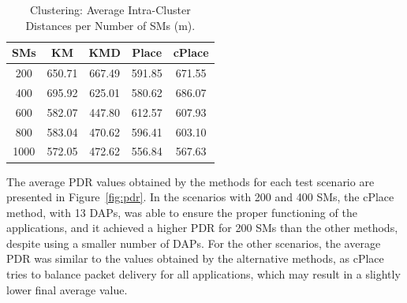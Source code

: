 \documentclass[a4paper,fleqn]{cas-dc}
\begin{document}
\begin{table}[ht]
    \centering
    \caption{Clustering: Average Intra-Cluster Distances per Number of \gls{SMs} (m).}
    \begin{tabular}{ccccc}
        \hline \hline
        \gls{SMs} & KM     & KMD    & Place  & cPlace \\ \hline
        200      & 650.71 & 667.49 & 591.85 & 671.55 \\
        400      & 695.92 & 625.01 & 580.62 & 686.07 \\
        600      & 582.07 & 447.80 & 612.57 & 607.93 \\ 
        800      & 583.04 & 470.62 & 596.41 & 603.10 \\ 
        1000     & 572.05 & 472.62 & 556.84 & 567.63 \\ 
        \hline \hline
    \end{tabular}
    \label{tab:dists}
\end{table}

The average \gls{PDR} values obtained by the methods for each test scenario are presented in Figure~\ref{fig:pdr}. In the scenarios with 200 and 400 \gls{SMs}, the cPlace method, with 13 \gls{DAPs}, was able to ensure the proper functioning of the applications, and it achieved a higher \gls{PDR} for 200 \gls{SMs} than the other methods, despite using a smaller number of \gls{DAPs}. For the other scenarios, the average \gls{PDR} was similar to the values obtained by the alternative methods, as cPlace tries to balance packet delivery for all applications, which may result in a slightly lower final average value.
\end{document}
